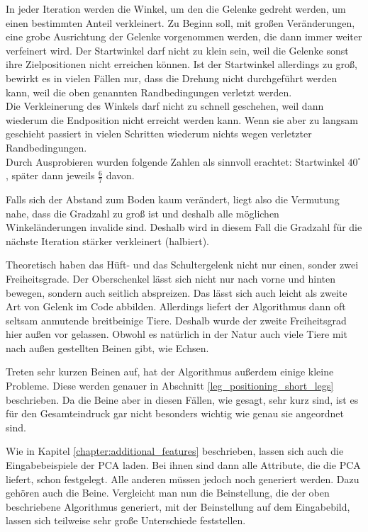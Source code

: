In jeder Iteration werden die Winkel, um den die Gelenke gedreht werden, um einen bestimmten Anteil verkleinert. Zu Beginn soll, mit großen Veränderungen, eine grobe Ausrichtung der Gelenke vorgenommen werden, die dann immer weiter verfeinert wird.
Der Startwinkel darf nicht zu klein sein, weil die Gelenke sonst ihre Zielpositionen nicht erreichen können. Ist der Startwinkel allerdings zu groß, bewirkt es in vielen Fällen nur, dass die Drehung nicht durchgeführt werden kann, weil die oben genannten Randbedingungen verletzt werden.\\
Die Verkleinerung des Winkels darf nicht zu schnell geschehen, weil dann wiederum die Endposition nicht erreicht werden kann. Wenn sie aber zu langsam geschieht passiert in vielen Schritten wiederum nichts wegen verletzter Randbedingungen.\\
Durch Ausprobieren wurden folgende Zahlen als sinnvoll erachtet: Startwinkel $40^{\circ}$, später dann jeweils $\frac{6}{7}$ davon.

Falls sich der Abstand zum Boden kaum verändert, liegt also die Vermutung nahe, dass die Gradzahl zu groß ist und deshalb alle möglichen Winkeländerungen invalide sind. Deshalb wird in diesem Fall die Gradzahl für die nächste Iteration stärker verkleinert (halbiert).


Theoretisch haben das Hüft- und das Schultergelenk nicht nur einen, sonder zwei Freiheitsgrade. Der Oberschenkel lässt sich nicht nur nach vorne und hinten bewegen, sondern auch seitlich abspreizen. Das lässt sich auch leicht als zweite Art von Gelenk im Code abbilden. Allerdings liefert der Algorithmus dann oft seltsam anmutende breitbeinige Tiere.
Deshalb wurde der zweite Freiheitsgrad hier außen vor gelassen.
Obwohl es natürlich in der Natur auch viele Tiere mit nach außen gestellten Beinen gibt, wie \zb Echsen.

Treten sehr kurzen Beinen auf, hat der Algorithmus außerdem einige kleine Probleme. Diese werden genauer in Abschnitt \ref{leg_positioning_short_legs} beschrieben. Da die Beine aber in diesen Fällen, wie gesagt, sehr kurz sind, ist es für den Gesamteindruck gar nicht besonders wichtig wie genau sie angeordnet sind.

Wie in Kapitel \ref{chapter:additional_features} beschrieben, lassen sich auch die Eingabebeispiele der PCA laden. Bei ihnen sind dann alle Attribute, die die PCA liefert, schon festgelegt. Alle anderen müssen jedoch noch generiert werden.
Dazu gehören auch die Beine.
Vergleicht man nun die Beinstellung, die der oben beschriebene Algorithmus generiert, mit der Beinstellung auf dem Eingabebild, lassen sich teilweise sehr große Unterschiede feststellen. 

